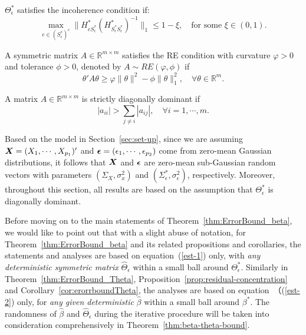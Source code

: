 \begin{definition}\label{def:incoherence} $\Theta^*_\epsilon$ satisfies the incoherence condition if:
\begin{equation*}
\max\limits_{e\in (S_\epsilon^*)^c}\| H^*_{eS^*_\epsilon}(H^*_{S_\epsilon^* S_\epsilon^*})^{-1}\|_1 \leq 1-\xi, \quad \text{for some }\xi\in(0,1).
\end{equation*}
\end{definition}
\begin{definition} A symmetric matrix $A\in\mathbb{R}^{m\times m}$ satisfies the RE condition with curvature $\varphi>0$ and tolerance $\phi>0$, denoted by $A\sim RE(\varphi,\phi)$ if 
\begin{equation*}
\theta'A\theta\geq \varphi\|\theta\|^2 - \phi\|\theta\|_1^2, \quad \forall \theta\in\mathbb{R}^m.
\end{equation*}
\end{definition}

\begin{definition} A matrix $A\in\mathbb{R}^{m\times m}$ is strictly diagonally dominant if 
\begin{equation*}
|a_{ii}|>\sum_{j\neq i}|a_{ij}|,\quad \forall i=1,\cdots,m.
\end{equation*}
\end{definition}


Based on the model in Section~\ref{sec:set-up}, since we are assuming $\boldsymbol{X}=(X_1,\cdots,X_{p_1})'$ and $\boldsymbol{\epsilon}=(\epsilon_1,\cdots,\epsilon_{p_2})$ come from zero-mean Gaussian distributions, it follows that $\boldsymbol{X}$ and $\boldsymbol{\epsilon}$ are zero-mean sub-Gaussian random vectors with parameters $(\Sigma_X,\sigma_x^2)$ and $(\Sigma_\epsilon^*,\sigma_\epsilon^2)$, respectively. Moreover, throughout this section, all results are based on the assumption that $\Theta_\epsilon^*$ is diagonally dominant. 


\begin{remark}
Before moving on to the main statements of Theorem~\ref{thm:ErrorBound_beta}, we would like to point out that with a slight abuse of notation, for Theorem~\ref{thm:ErrorBound_beta} and its related propositions and corollaries, the statements and analyses are based on equation~(\ref{est-1}) only, with \textit{any deterministic symmetric matrix} $\widehat{\Theta}_\epsilon$ within a small ball around $\Theta^*_\epsilon$. Similarly in Theorem~\ref{thm:ErrorBound_Theta}, Proposition~\ref{prop:residual-concentration} and Corollary~\ref{cor:erorrboundTheta}, the analyses are based on equation~（(\ref{est-2}) only, for {\em any given deterministic}  $\widehat{\beta}$ within a small ball around $\beta^*$. The randomness of $\widehat{\beta}$ and $\widehat{\Theta}_\epsilon$ during the iterative procedure will be taken into consideration comprehensively in Theorem~\ref{thm:beta-theta-bound}. 
\end{remark}

